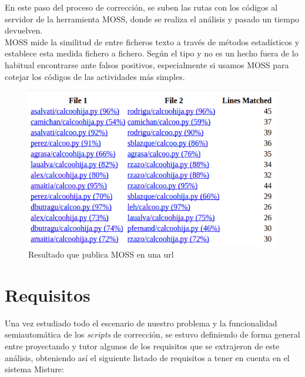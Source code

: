 En este paso del proceso de corrección, se suben las rutas con los códigos al servidor de la herramienta MOSS, donde se realiza el análisis y pasado un tiempo devuelven.\\


MOSS mide la similitud de entre ficheros texto a través de métodos estadísticos y establece esta medida fichero a fichero. Según el tipo y no es un hecho fuera de lo habitual encontrarse ante falsos positivos, especialmente si usamos MOSS para cotejar los códigos de las actividades más simples.\\

\begin{figure}[H]
   \centering
   \includegraphics[width=16cm]{img/Selection_021_moss}
   \caption{Resultado que publica MOSS en una url}
   \label{figura:res_moss}
\end{figure}

\section{Requisitos}
\label{sec:requisitos}


Una vez estudiado todo el escenario de nuestro problema y la funcionalidad semiautomática de los \textit{scripts} de corrección, se estuvo definiendo de forma general entre proyectando y tutor algunos de los requisitos que se extrajeron de este análisis, obteniendo así el siguiente listado de requisitos a tener en cuenta en el sistema Misture:

